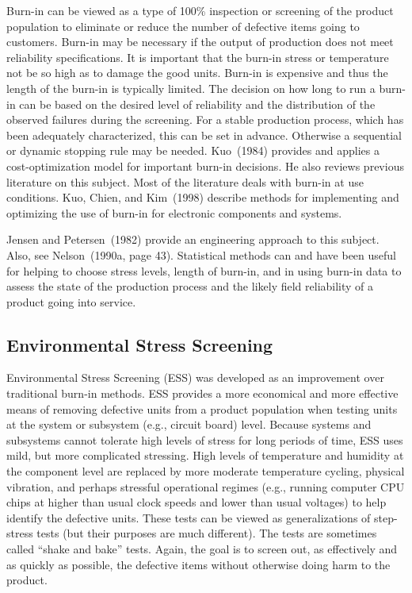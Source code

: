 Burn-in can be viewed as a type of 100\% inspection or screening of
the product population to eliminate or reduce the number of
defective items going to customers.  Burn-in may be necessary if the
output of production does not meet reliability specifications.  It
is important that the burn-in stress or temperature not be so high
as to damage the good units.  Burn-in is expensive and thus the
length of the burn-in is typically limited.  The decision on how
long to run a burn-in can be based on the desired level of
reliability and the distribution of the observed failures during the
screening. For a stable production process, which has been
adequately characterized, this can be set in advance.  Otherwise a
sequential or dynamic stopping rule may be needed.  Kuo~(1984)
provides and applies a cost-optimization model for important burn-in
decisions.  He also reviews previous literature on this
subject. Most of the literature deals with burn-in at use
conditions.  Kuo, Chien, and Kim~(1998) describe methods for
implementing and optimizing the use of burn-in for electronic
components and systems.


Jensen and Petersen~(1982) provide an engineering approach to this
subject. Also, see Nelson~(1990a, page 43).  Statistical methods can
and have been useful for helping to choose stress levels, length of
burn-in, and in using burn-in data to assess the state of the
production process and the likely field reliability of a product
going into service.

\subsection{Environmental Stress Screening}

Environmental Stress Screening (ESS) was developed as an improvement
over traditional burn-in methods. ESS provides a more economical and
more effective means of removing defective units from a product
population when testing units at the system or subsystem (e.g.,
circuit board) level.  Because systems and subsystems cannot tolerate
high levels of stress for long periods of time, ESS uses mild, but
more complicated stressing. High levels of temperature and humidity at
the component level are replaced by more moderate temperature cycling,
physical vibration, and perhaps stressful operational regimes (e.g.,
running computer CPU chips at higher than usual clock speeds and lower
than usual voltages) to help identify the defective units.  These
tests can be viewed as generalizations of step-stress tests (but their
purposes are much different).  The tests are sometimes called ``shake
and bake'' tests.  Again, the goal is to screen out, as effectively
and as quickly as possible, the defective items without otherwise
doing harm to the product.

